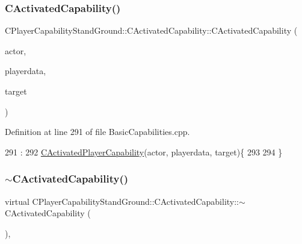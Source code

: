 \subsubsection{\texorpdfstring{C\+Activated\+Capability()}{CActivatedCapability()}}
{\footnotesize\ttfamily C\+Player\+Capability\+Stand\+Ground\+::\+C\+Activated\+Capability\+::\+C\+Activated\+Capability (\begin{DoxyParamCaption}\item[{std\+::shared\+\_\+ptr$<$ \hyperlink{classCPlayerAsset}{C\+Player\+Asset} $>$}]{actor,  }\item[{std\+::shared\+\_\+ptr$<$ \hyperlink{classCPlayerData}{C\+Player\+Data} $>$}]{playerdata,  }\item[{std\+::shared\+\_\+ptr$<$ \hyperlink{classCPlayerAsset}{C\+Player\+Asset} $>$}]{target }\end{DoxyParamCaption})}



Definition at line 291 of file Basic\+Capabilities.\+cpp.


\begin{DoxyCode}
291                                                                                                            
                                                                                    :
292 \hyperlink{classCActivatedPlayerCapability_a1ece00ffb6a7b925c84dd94a7407a0d1}{CActivatedPlayerCapability}(actor, playerdata, target)\{
293 
294 \}
\end{DoxyCode}
\hypertarget{classCPlayerCapabilityStandGround_1_1CActivatedCapability_a7fe4c33b38b30befad569944ded1e402}{}\label{classCPlayerCapabilityStandGround_1_1CActivatedCapability_a7fe4c33b38b30befad569944ded1e402} 
\subsubsection{\texorpdfstring{$\sim$\+C\+Activated\+Capability()}{~CActivatedCapability()}}
{\footnotesize\ttfamily virtual C\+Player\+Capability\+Stand\+Ground\+::\+C\+Activated\+Capability\+::$\sim$\+C\+Activated\+Capability (\begin{DoxyParamCaption}{ }\end{DoxyParamCaption})\hspace{0.3cm}{\ttfamily [inline]}, {\ttfamily [virtual]}}



